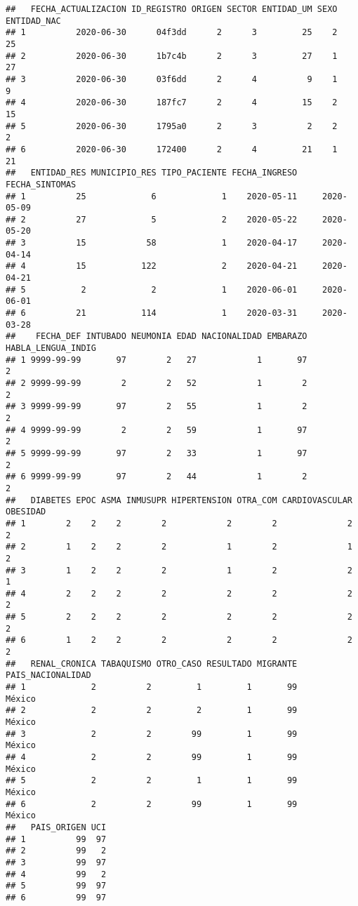 \documentclass[]{article}
\begin{document}
\begin{verbatim}
##   FECHA_ACTUALIZACION ID_REGISTRO ORIGEN SECTOR ENTIDAD_UM SEXO ENTIDAD_NAC
## 1          2020-06-30      04f3dd      2      3         25    2          25
## 2          2020-06-30      1b7c4b      2      3         27    1          27
## 3          2020-06-30      03f6dd      2      4          9    1           9
## 4          2020-06-30      187fc7      2      4         15    2          15
## 5          2020-06-30      1795a0      2      3          2    2           2
## 6          2020-06-30      172400      2      4         21    1          21
##   ENTIDAD_RES MUNICIPIO_RES TIPO_PACIENTE FECHA_INGRESO FECHA_SINTOMAS
## 1          25             6             1    2020-05-11     2020-05-09
## 2          27             5             2    2020-05-22     2020-05-20
## 3          15            58             1    2020-04-17     2020-04-14
## 4          15           122             2    2020-04-21     2020-04-21
## 5           2             2             1    2020-06-01     2020-06-01
## 6          21           114             1    2020-03-31     2020-03-28
##    FECHA_DEF INTUBADO NEUMONIA EDAD NACIONALIDAD EMBARAZO HABLA_LENGUA_INDIG
## 1 9999-99-99       97        2   27            1       97                  2
## 2 9999-99-99        2        2   52            1        2                  2
## 3 9999-99-99       97        2   55            1        2                  2
## 4 9999-99-99        2        2   59            1       97                  2
## 5 9999-99-99       97        2   33            1       97                  2
## 6 9999-99-99       97        2   44            1        2                  2
##   DIABETES EPOC ASMA INMUSUPR HIPERTENSION OTRA_COM CARDIOVASCULAR OBESIDAD
## 1        2    2    2        2            2        2              2        2
## 2        1    2    2        2            1        2              1        2
## 3        1    2    2        2            1        2              2        1
## 4        2    2    2        2            2        2              2        2
## 5        2    2    2        2            2        2              2        2
## 6        1    2    2        2            2        2              2        2
##   RENAL_CRONICA TABAQUISMO OTRO_CASO RESULTADO MIGRANTE PAIS_NACIONALIDAD
## 1             2          2         1         1       99            México
## 2             2          2         2         1       99            México
## 3             2          2        99         1       99            México
## 4             2          2        99         1       99            México
## 5             2          2         1         1       99            México
## 6             2          2        99         1       99            México
##   PAIS_ORIGEN UCI
## 1          99  97
## 2          99   2
## 3          99  97
## 4          99   2
## 5          99  97
## 6          99  97
\end{verbatim}
\end{document}
